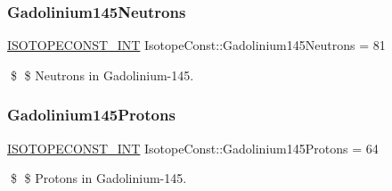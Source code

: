 \subsubsection{\texorpdfstring{Gadolinium145\+Neutrons}{Gadolinium145Neutrons}}
{\footnotesize\ttfamily \mbox{\hyperlink{group___isotope_const-_macros_ga5f18360b3e99483a35c32d789e62621c}{I\+S\+O\+T\+O\+P\+E\+C\+O\+N\+S\+T\+\_\+\+I\+NT}} Isotope\+Const\+::\+Gadolinium145\+Neutrons = 81}

\$ \$ Neutrons in Gadolinium-\/145. \mbox{\label{group___isotope_const-_gadolinium-_gd145_ga0ea9c3480d31c8ebfca9e98ad9faa0fe}} 
\subsubsection{\texorpdfstring{Gadolinium145\+Protons}{Gadolinium145Protons}}
{\footnotesize\ttfamily \mbox{\hyperlink{group___isotope_const-_macros_ga5f18360b3e99483a35c32d789e62621c}{I\+S\+O\+T\+O\+P\+E\+C\+O\+N\+S\+T\+\_\+\+I\+NT}} Isotope\+Const\+::\+Gadolinium145\+Protons = 64}

\$ \$ Protons in Gadolinium-\/145. 